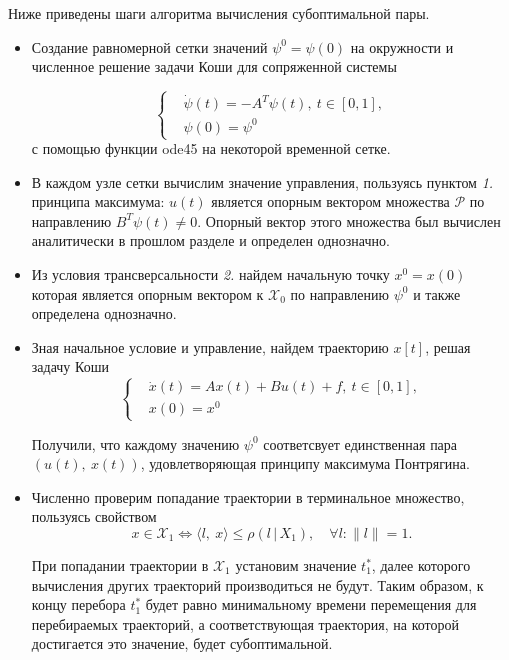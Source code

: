 \documentclass[11pt]{article}
\newcommand\PS{\mathcal{P}}
\newcommand\X{\mathcal{X}}
\newcommand\Sup[2]{\rho( #1 \, | \, #2 )}
\begin{document}
Ниже приведены шаги алгоритма вычисления субоптимальной пары.

\begin{itemize}
\item Создание равномерной сетки значений $\psi^0 = \psi(0)$ на окружности и численное решение
задачи Коши для сопряженной системы 

\begin{equation}
\left\{
	\begin{aligned}
	& \dot{\psi}(t) = -A^T\psi(t), \ t \in [0, 1], \\
	& \psi(0) = \psi^0
	\end{aligned}	
\right.
\end{equation}
с помощью функции ode45 на некоторой временной сетке.

\item В каждом узле сетки вычислим значение управления, пользуясь пунктом \textit{1.} принципа
 максимума: $u(t)$ является опорным вектором множества $\PS$ по направлению $B^T\psi(t) \not= 0$.
Опорный вектор этого множества был вычислен аналитически в прошлом разделе и определен однозначно.

\item Из условия трансверсальности \textit{2.} найдем начальную точку $x^0 = x(0)$ которая является
опорным вектором к $\X_0$ по направлению $\psi^0$ и также определена однозначно.

\item Зная начальное условие и управление, найдем траекторию $x[t]$, решая задачу Коши
\begin{equation}
\left\{
	\begin{aligned}
	& \dot{x}(t) = Ax(t) + Bu(t) + f, \ t \in [0, 1], \\
	& x(0) = x^0
	\end{aligned}	
\right.
\end{equation}

Получили, что каждому значению $\psi^0$ соответсвует единственная пара $(u(t), \ x(t))$, 
удовлетворяющая принципу максимума Понтрягина.
\item Численно проверим попадание траектории в терминальное множество, пользуясь свойством
\begin{equation}
x \in \X_1 \Leftrightarrow \langle l, \ x \rangle \le \Sup{l}{X_1}, \quad \forall l \colon \|l\| = 1.
\end{equation}

При попадании траектории в $\X_1$ установим значение $t_1^*$, далее которого вычисления других
 траекторий производиться не будут. Таким образом, к концу перебора $t_1^*$ будет равно минимальному
 времени перемещения для перебираемых траекторий, а соответствующая траектория, на которой достигается
 это значение, будет субоптимальной.
 

\end{itemize}
\end{document}
